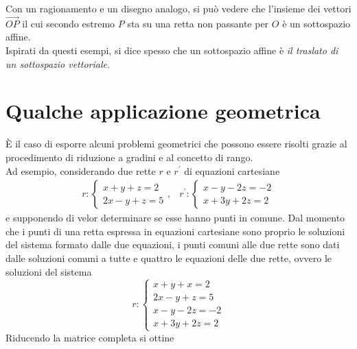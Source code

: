 Con un ragionamento e un disegno analogo, si può vedere che l'insieme dei vettori $\vec{OP}$ il cui
secondo estremo $P$ sta su una retta non passante per $O$ è un sottospazio affine.\\
Ispirati da questi esempi, si dice spesso che un sottospazio affine è \textit{il traslato di un
  sottospazio vettoriale}.

\section{Qualche applicazione geometrica}
\label{sec:qualcheappgeo}

È il caso di esporre alcuni problemi geometrici che possono essere risolti grazie al procedimento
di riduzione a gradini e al concetto di rango.\\
Ad esempio, considerando due rette $r$ e $r^\prime$ di equazioni cartesiane
\begin{eqnarray}
  \label{eq:qualcheappgeo1}
  r:
  \begin{cases}
    x+y+z=2\\
    2x-y+z=5
  \end{cases}, & r^\prime:
  \begin{cases}
    x-y-2z=-2\\
    x+3y+2z=2
  \end{cases}
\end{eqnarray}
e supponendo di velor determinare se esse hanno punti in comune. Dal momento che i punti di una retta
espressa in equazioni cartesiane sono proprio le soluzioni del sistema formato dalle due equazioni,
i punti comuni alle due rette sono dati dalle soluzioni comuni a tutte e quattro le equazioni delle
due rette, ovvero le soluzioni del sistema
\begin{equation}
  \label{eq:qualcheappgeo2}
  r:
  \begin{cases}
    x+y+x=2\\
    2x-y+z=5\\
    x-y-2z=-2\\
    x+3y+2z=2
  \end{cases}
\end{equation}
Riducendo la matrice completa si ottine
